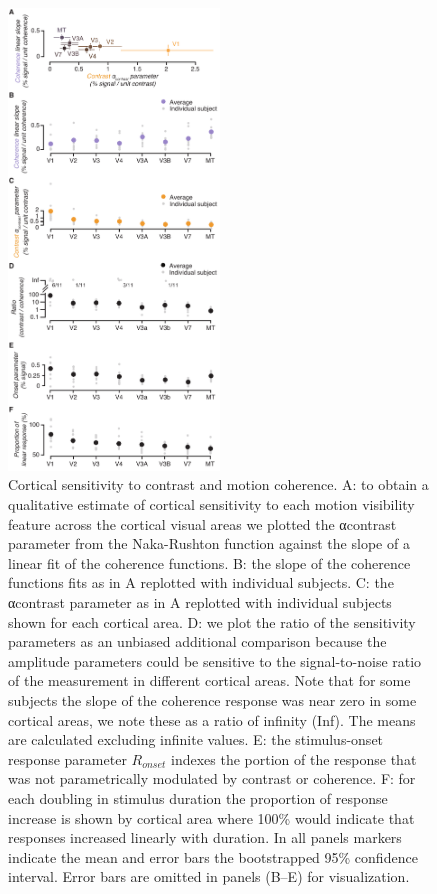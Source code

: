 \begin{figure}
\centering
\includegraphics[keepaspectratio,width=0.5\textwidth]{figs_c2/Fig6_sensitivity.pdf}
\caption[Cortical sensitivity to contrast and motion coherence]{Cortical sensitivity to contrast and motion coherence. A: to obtain a qualitative estimate of cortical sensitivity to each motion visibility feature across the cortical visual areas we plotted the αcontrast parameter from the Naka-Rushton function against the slope of a linear fit of the coherence functions. B: the slope of the coherence functions fits as in A replotted with individual subjects. C: the αcontrast parameter as in A replotted with individual subjects shown for each cortical area. D: we plot the ratio of the sensitivity parameters as an unbiased additional comparison because the amplitude parameters could be sensitive to the signal-to-noise ratio of the measurement in different cortical areas. Note that for some subjects the slope of the coherence response was near zero in some cortical areas, we note these as a ratio of infinity (Inf). The means are calculated excluding infinite values. E: the stimulus-onset response parameter $R_{onset}$ indexes the portion of the response that was not parametrically modulated by contrast or coherence. F: for each doubling in stimulus duration the proportion of response increase is shown by cortical area where 100\% would indicate that responses increased linearly with duration. In all panels markers indicate the mean and error bars the bootstrapped 95\% confidence interval. Error bars are omitted in panels (B–E) for visualization.}
\label{fig:c2f6}
\end{figure}

